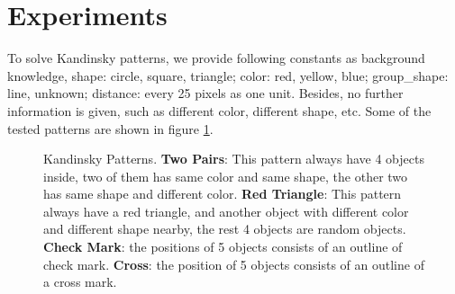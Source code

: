 \documentclass[
]{ceurart}
\begin{document}
\section{Experiments}
To solve Kandinsky patterns, we provide following constants as background knowledge, 
shape: circle, square, triangle; color: red, yellow, blue; group\_shape: line, unknown; distance: every 25 pixels as one unit. Besides, no further information is given, such as different color, different shape, etc. Some of the tested patterns are shown in figure \ref{fig:kandinsky-patterns}.

\begin{figure}[!htb]
	\centering
	\caption{Kandinsky Patterns. \textbf{Two Pairs}: This pattern always have 4 objects inside, two of them has same color and same shape, the other two has same shape and different color. \textbf{Red Triangle}: This pattern always have a red triangle, and another object with different color and different shape nearby, the rest 4 objects are random objects. \textbf{Check Mark}: the positions of 5 objects consists of an outline of check mark. \textbf{Cross}: the position of 5 objects consists of an outline of a cross mark.}
	\label{fig:kandinsky-patterns}
\end{figure}
\end{document}

